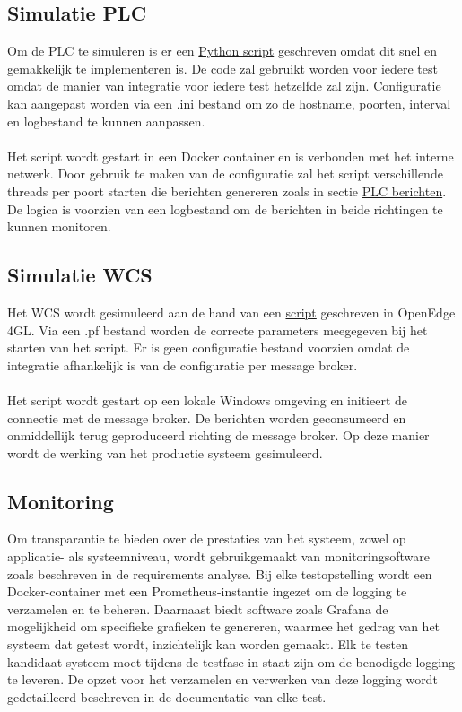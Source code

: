 \subsection{Simulatie PLC}
Om de PLC te simuleren is er een \hyperref[sec:codeplc]{Python script} geschreven omdat dit snel en gemakkelijk te implementeren is.
De code zal gebruikt worden voor iedere test omdat de manier van integratie voor iedere test hetzelfde zal zijn.
Configuratie kan aangepast worden via een .ini bestand om zo de hostname, poorten, interval en logbestand te kunnen aanpassen.
\\\\
Het script wordt gestart in een Docker container en is verbonden met het interne netwerk.
Door gebruik te maken van de configuratie zal het script verschillende threads per poort starten die berichten genereren
zoals in sectie \hyperref[listing:message_example]{PLC berichten}.
De logica is voorzien van een logbestand om de berichten in beide richtingen te kunnen monitoren.

\subsection{Simulatie WCS}
Het WCS wordt gesimuleerd aan de hand van een \hyperref[sec:codewcs]{script} geschreven in OpenEdge 4GL.
Via een .pf bestand worden de correcte parameters meegegeven bij het starten van het script.
Er is geen configuratie bestand voorzien omdat de integratie afhankelijk is van de configuratie per message broker.
\\\\
Het script wordt gestart op een lokale Windows omgeving en initieert de connectie met de message broker.
De berichten worden geconsumeerd en onmiddellijk terug geproduceerd richting de message broker.
Op deze manier wordt de werking van het productie systeem gesimuleerd.

\subsection{Monitoring}
Om transparantie te bieden over de prestaties van het systeem, zowel op applicatie- als systeemniveau, 
wordt gebruikgemaakt van monitoringsoftware zoals beschreven in de requirements analyse.
Bij elke testopstelling wordt een Docker-container met een Prometheus-instantie ingezet om de logging te verzamelen en te beheren.
Daarnaast biedt software zoals Grafana de mogelijkheid om specifieke grafieken te genereren, 
waarmee het gedrag van het systeem dat getest wordt, inzichtelijk kan worden gemaakt.
Elk te testen kandidaat-systeem moet tijdens de testfase in staat zijn om de benodigde logging te leveren. 
De opzet voor het verzamelen en verwerken van deze logging wordt gedetailleerd beschreven in de documentatie van elke test.
\newpage


